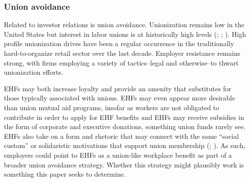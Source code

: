 \documentclass[
  11pt,
  oneside]{article}
\begin{document}
\subsubsection{Union avoidance}\label{union-avoidance}

Related to investor relations is union avoidance. Unionization remains low in the United States but interest in labor unions is at historically high levels (; ; ). High profile unionization drives have been a regular occurrence in the traditionally hard-to-organize retail sector over the last decade. Employer resistance remains strong, with firms employing a variety of tactics--legal and otherwise--to thwart unionization efforts.

EHFs may both increase loyalty and provide an amenity that substitutes for those typically associated with unions. EHFs may even appear more desirable than union mutual aid programs, insofar as workers are not obligated to contribute in order to apply for EHF benefits and EHFs may receive subsidies in the form of corporate and executive donations, something union funds rarely see. EHFs also take on a form and rhetoric that may connect with the same ``social custom'' or solidaristic motivations that support union membership (; ). As such, employers could point to EHFs as a union-like workplace benefit as part of a broader union avoidance strategy. Whether this strategy might plausibly work is something this paper seeks to determine.
\end{document}

